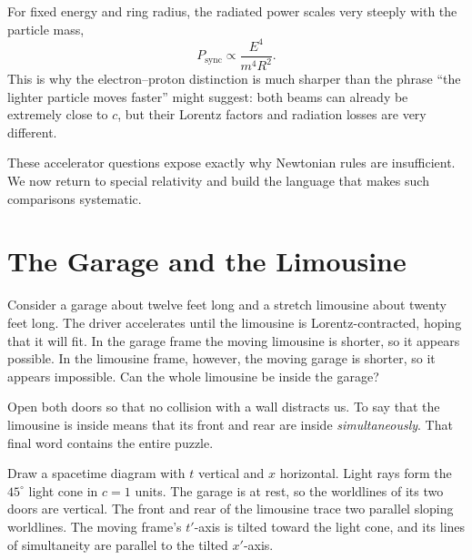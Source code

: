 For fixed energy and ring radius, the radiated power scales very steeply with
the particle mass,
\begin{equation}
P_{\mathrm{sync}}\propto \frac{E^4}{m^4R^2}.
\end{equation}
This is why the electron--proton distinction is much sharper than the phrase
``the lighter particle moves faster'' might suggest: both beams can already be
extremely close to \(c\), but their Lorentz factors and radiation losses are
very different.

\begin{classroomqa}
\end{classroomqa}

These accelerator questions expose exactly why Newtonian rules are
insufficient. We now return to special relativity and build the language that
makes such comparisons systematic.

\section{The Garage and the Limousine}

Consider a garage about twelve feet long and a stretch limousine about twenty
feet long. The driver accelerates until the limousine is Lorentz-contracted,
hoping that it will fit. In the garage frame the moving limousine is shorter,
so it appears possible. In the limousine frame, however, the moving garage is
shorter, so it appears impossible. Can the whole limousine be inside the
garage?

Open both doors so that no collision with a wall distracts us. To say that the
limousine is inside means that its front and rear are inside
\emph{simultaneously}. That final word contains the entire puzzle.

Draw a spacetime diagram with \(t\) vertical and \(x\) horizontal. Light rays
form the \(45^\circ\) light cone in \(c=1\) units. The garage is at rest, so
the worldlines of its two doors are vertical. The front and rear of the
limousine trace two parallel sloping worldlines. The moving frame's \(t'\)-axis
is tilted toward the light cone, and its lines of simultaneity are parallel to
the tilted \(x'\)-axis.

